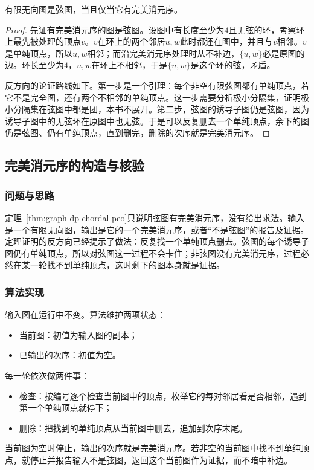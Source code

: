 \begin{theorem}[弦图与完美消元序]
\label{thm:graph-dp-chordal-peo}
有限无向图是弦图，当且仅当它有完美消元序。
\end{theorem}

\begin{proof}
先证有完美消元序的图是弦图。设图中有长度至少为$4$且无弦的环，考察环上最先被处理的顶点$v$。$v$在环上的两个邻居$u,w$此时都还在图中，并且与$v$相邻。$v$是单纯顶点，所以$u,w$相邻；而沿完美消元序处理时从不补边，$\{u,w\}$必是原图的边。环长至少为$4$，$u,w$在环上不相邻，于是$\{u,w\}$是这个环的弦，矛盾。

反方向的论证路线如下。第一步是一个引理：每个非空有限弦图都有单纯顶点，若它不是完全图，还有两个不相邻的单纯顶点。这一步需要分析极小分隔集，证明极小分隔集在弦图中都是团，本书不展开。第二步，弦图的诱导子图仍是弦图，因为诱导子图中的无弦环在原图中也无弦。于是可以反复删去一个单纯顶点，余下的图仍是弦图、仍有单纯顶点，直到删完，删除的次序就是完美消元序。
\end{proof}

\subsection{完美消元序的构造与核验}
\label{sec:graph-dp-peo-construction}

\subsubsection{问题与思路}

定理~\ref{thm:graph-dp-chordal-peo}只说明弦图有完美消元序，没有给出求法。输入是一个有限无向图，输出是它的一个完美消元序，或者“不是弦图”的报告及证据。定理证明的反方向已经提示了做法：反复找一个单纯顶点删去。弦图的每个诱导子图仍有单纯顶点，所以对弦图这一过程不会卡住；非弦图没有完美消元序，过程必然在某一轮找不到单纯顶点，这时剩下的图本身就是证据。

\subsubsection{算法实现}

输入图在运行中不变。算法维护两项状态：
\begin{itemize}
  \item 当前图：初值为输入图的副本；
  \item 已输出的次序：初值为空。
\end{itemize}
每一轮依次做两件事：
\begin{itemize}
  \item 检查：按编号逐个检查当前图中的顶点，枚举它的每对邻居看是否相邻，遇到第一个单纯顶点就停下；
  \item 删除：把找到的单纯顶点从当前图中删去，追加到次序末尾。
\end{itemize}
当前图为空时停止，输出的次序就是完美消元序。若非空的当前图中找不到单纯顶点，就停止并报告输入不是弦图，返回这个当前图作为证据，而不暗中补边。


